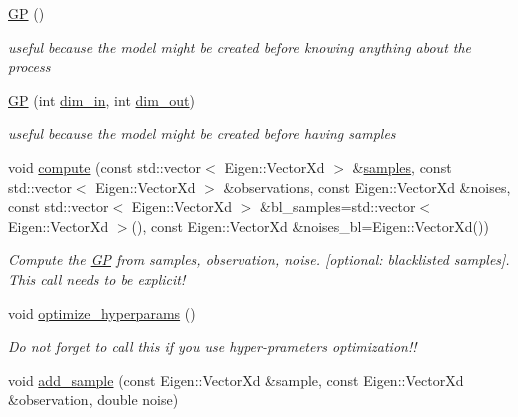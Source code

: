 \begin{DoxyCompactItemize}
\item 
\hyperlink{classlimbo_1_1model_1_1_g_p_aa18de82f231f3aed6ce8cce4c778aedb}{G\+P} ()
\begin{DoxyCompactList}\small\item\em useful because the model might be created before knowing anything about the process \end{DoxyCompactList}\item 
\hyperlink{classlimbo_1_1model_1_1_g_p_ab36947c89e4f5ad92599656a21829755}{G\+P} (int \hyperlink{classlimbo_1_1model_1_1_g_p_a41d99e6a69d53fc7d9260d295f787bc3}{dim\+\_\+in}, int \hyperlink{classlimbo_1_1model_1_1_g_p_a077144695f9f0b33b64d4feb8fb4e447}{dim\+\_\+out})
\begin{DoxyCompactList}\small\item\em useful because the model might be created before having samples \end{DoxyCompactList}\item 
void \hyperlink{classlimbo_1_1model_1_1_g_p_a3597b1c02b61d0ea1301808b08d8abb7}{compute} (const std\+::vector$<$ Eigen\+::\+Vector\+Xd $>$ \&\hyperlink{classlimbo_1_1model_1_1_g_p_abaa15a2e503bac670dd1a35fb377aa23}{samples}, const std\+::vector$<$ Eigen\+::\+Vector\+Xd $>$ \&observations, const Eigen\+::\+Vector\+Xd \&noises, const std\+::vector$<$ Eigen\+::\+Vector\+Xd $>$ \&bl\+\_\+samples=std\+::vector$<$ Eigen\+::\+Vector\+Xd $>$(), const Eigen\+::\+Vector\+Xd \&noises\+\_\+bl=Eigen\+::\+Vector\+Xd())
\begin{DoxyCompactList}\small\item\em Compute the \hyperlink{classlimbo_1_1model_1_1_g_p}{G\+P} from samples, observation, noise. \mbox{[}optional\+: blacklisted samples\mbox{]}. This call needs to be explicit! \end{DoxyCompactList}\item 
void \hyperlink{classlimbo_1_1model_1_1_g_p_aa01b41e37de4def676cf6c79b08aac94}{optimize\+\_\+hyperparams} ()
\begin{DoxyCompactList}\small\item\em Do not forget to call this if you use hyper-\/prameters optimization!! \end{DoxyCompactList}\item 
void \hyperlink{classlimbo_1_1model_1_1_g_p_a43e4e23d98c421d610df52ea6d3f3539}{add\+\_\+sample} (const Eigen\+::\+Vector\+Xd \&sample, const Eigen\+::\+Vector\+Xd \&observation, double noise)
\item 

\end{DoxyCompactItemize}
